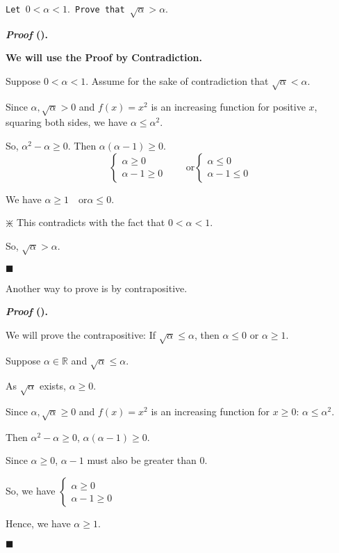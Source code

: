 \documentclass[12pt,a4paper]{article}
\newcounter{nprf}[subsection]
\newenvironment*{prf}{\par\indent\textbf{\textit{Proof} (\stepcounter{nprf}\thenprf). }\par}{\par\hfill $\blacksquare$\par}
\def\R{{\mathbb{R}}}
\begin{document}
\begin{framed}
\noindent\texttt{Let $0<\alpha<1.$ Prove that $\sqrt{\alpha}>\alpha.$}
\begin{prf}
	\textbf{We will use the Proof by Contradiction.}\par 
	Suppose $0<\alpha<1.$ Assume for the sake of contradiction that $\sqrt{\alpha}<\alpha.$\par Since $\alpha,\sqrt{\alpha}>0$ and $f(x)=x^2$ is an increasing function for positive $x$, squaring both sides, we have $\alpha\leq\alpha^2.$\par So, $\alpha^2-\alpha\geq0$. Then $\alpha(\alpha-1)\geq0.$\[\begin{cases}\alpha\geq0\\\alpha-1\geq0\end{cases}\qquad\text{or}\begin{cases}\alpha\leq0\\\alpha-1\leq0\end{cases}\]\par We have $\alpha\geq1\quad\text{or}\alpha\leq0$.\par\begin{center}$\divideontimes$ This contradicts with the fact that $0<\alpha<1.$\end{center}\par So, $\sqrt{\alpha}>\alpha.$
\end{prf}	
Another way to prove is by contrapositive.
\begin{prf}
	We will prove the contrapositive: If $\sqrt{\alpha}\leq\alpha$, then $\alpha\leq0$ or $\alpha\geq1.$\par Suppose $\alpha\in\R$ and $\sqrt{\alpha}\leq\alpha$.\par As $\sqrt{\alpha}$ exists, $\alpha\geq0.$\par Since $\alpha,\sqrt{\alpha}\geq0$ and $f(x)=x^2$ is an increasing function for $x\geq0$: $\alpha\leq\alpha^2.$ \par Then $\alpha^2-\alpha\geq0$, $\alpha(\alpha-1)\geq0$.\par Since $\alpha\geq0$, $\alpha-1$ must also be greater than $0$.\par So, we have $\begin{cases}\alpha\geq0\\\alpha-1\geq0\end{cases}$\par Hence, we have $\alpha\geq1.$
\end{prf}
\end{framed}
\end{document}

